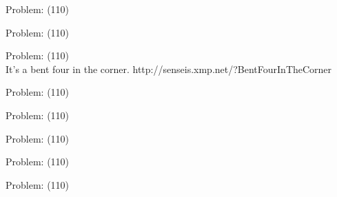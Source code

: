 \documentclass[11pt]{article}
\begin{document}
\begin{minipage}[t]{0.5\textwidth}
  {\centering
  
Problem: (110)\\
  }
\end{minipage}
\begin{minipage}[t]{0.5\textwidth}
  {\centering
  
Problem: (110)\\
  }
\end{minipage}
\begin{minipage}[t]{0.5\textwidth}
  {\centering
  
Problem: (110)\\
It's a bent four in the corner. 
http://senseis.xmp.net/?BentFourInTheCorner\\
  }
\end{minipage}
\begin{minipage}[t]{0.5\textwidth}
  {\centering
  
Problem: (110)\\
  }
\end{minipage}
\begin{minipage}[t]{0.5\textwidth}
  {\centering
  
Problem: (110)\\
  }
\end{minipage}
\begin{minipage}[t]{0.5\textwidth}
  {\centering
  
Problem: (110)\\
  }
\end{minipage}
\begin{minipage}[t]{0.5\textwidth}
  {\centering
  
Problem: (110)\\
  }
\end{minipage}
\begin{minipage}[t]{0.5\textwidth}
  {\centering
  
Problem: (110)\\
  }
\end{minipage}
\end{document}
